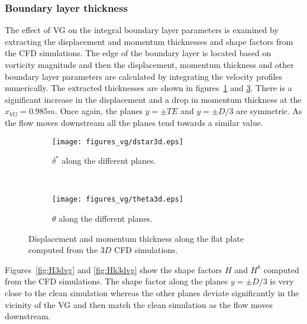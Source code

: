 \subsubsection{Boundary layer thickness}
The effect of VG on the integral boundary layer parameters is examined by extracting the displacement and momentum thicknesses and shape factors from the CFD simulations. The edge of the boundary layer is located based on vorticity magnitude and then the displacement, momentum thickness and other boundary layer parameters are calculated by integrating the velocity profiles numerically. The extracted thicknesses are shown in figures~\ref{fig:dstr3d} and \ref{fig:thet3d}. There is  a significant increase in the displacement and a drop in momentum thickness at the $x_{VG}=0.985m$. Once again, the planes $y=\pm TE$ and $y=\pm D/3$ are symmetric. As the flow moves downstream all the planes tend towards a similar value.
\begin{figure}[h]
    \centering
    \captionsetup{justification=centering}
    \begin{subfigure}[b]{0.4\textwidth}
    \captionsetup{justification=centering}
    \centering
  \texttt{[image: figures\_vg/dstar3d.eps]}
  \caption{$\delta^{\ast}$ along the different planes.}
  \label{fig:dstr3d}
    \end{subfigure}
    ~ %
    \begin{subfigure}[b]{0.4\textwidth}
    \centering
    \captionsetup{justification=centering}
        \texttt{[image: figures\_vg/theta3d.eps]}
        \caption{$\theta$ along the different planes.}
        \label{fig:thet3d}
    \end{subfigure}
    \caption{Displacement and momentum thickness along the flat plate computed from the $3D$ CFD simulations.}
\end{figure}
Figures~\ref{fig:H3dvg} and \ref{fig:Hk3dvg} show the shape factors $H$ and $H^k$ computed from the CFD simulations. The shape factor along the planes $y=\pm D/3$ is very close to the clean simulation whereas the other planes deviate significantly in the vicinity of the VG and then match the clean simulation as the flow moves downstream.
